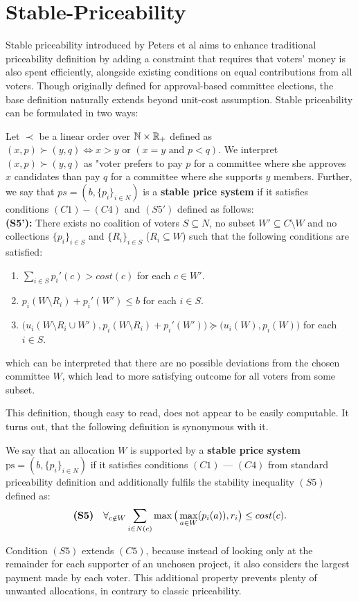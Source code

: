 \section{Stable-Priceability}
Stable priceability introduced by Peters et al \cite{MarketBased} aims to enhance traditional priceability definition by adding a constraint that requires that voters' money is also spent efficiently, alongside existing conditions on equal contributions from all voters. Though originally defined for approval-based committee elections, the base definition naturally extends beyond unit-cost assumption. Stable priceability can be formulated in two ways:
\begin{definition}
Let $\prec$ be a linear order over $\mathbb{N} \times \mathbb{R}_+$ defined as 
$(x,p) \succ (y,q) \iff x > y \text{ or } (x=y \text{ and } p < q)$. We interpret $(x,p)\succ (y,q)$ as "voter prefers to pay $p$ for a committee where she approves $x$ candidates than pay $q$ for a committee where she supports $y$ members. Further, we say that $ps=(b, \{p_i\}_{i\in N})$ is a \textbf{stable price system} if it satisfies conditions $(C1)-(C4)$ and $(S5')$ defined as follows:\leavevmode\\
\textbf{(S5'):} There exists no coalition of voters $S\subseteq N$, no subset $W'\subseteq C \setminus W$ and no collections $\{p_i\}_{i\in S}$ and $\{R_i\}_{i\in S}$ ($R_i\subseteq W$) such that the following conditions are satisfied:
\begin{enumerate}
    \item $\sum_{i\in S}p_i'(c)>cost(c)$ for each $c\in W'$.
    \item $p_i(W \setminus R_i)+p_i'(W')\le b$ for each $i \in S$.
    \item $\big(u_i(W\setminus R_i\cup W'), p_i(W\setminus R_i)+p_i'(W')\big) \succeq \big(u_i(W), p_i(W) \big)$ for each $i\in S$.
\end{enumerate}
which can be interpreted that there are no possible deviations from the chosen committee $W$, which lead to more satisfying outcome for all voters from some subset.
\end{definition}
This definition, though easy to read, does not appear to be easily computable. It turns out, that the following definition is synonymous with it.
\begin{definition}
We say that an allocation $W$ is supported by a \textbf{stable price system} $\text{ps} = (b, \{p_i\}_{i\in N})$ if it satisfies conditions $(C1)$ --- $(C4)$ from standard priceability definition and additionally fulfils the stability inequality $(S5)$ defined as:
$$
\mbox{\textbf{(S5)}} \quad \forall_{c\notin W}\sum_{i\in N(c)}\max\big(\max_{a\in W}(p_i(a)), r_i \big) \le cost(c).
$$
\end{definition}
Condition $(S5)$ extends $(C5)$, because instead of looking only at the remainder for each supporter of an unchosen project, it also considers the largest payment made by each voter. This additional property prevents plenty of unwanted allocations, in contrary to classic priceability.

